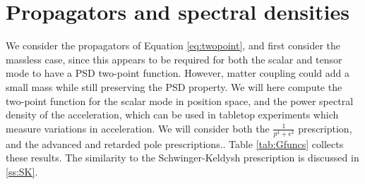 \documentclass[aps,preprintnumbers,superscriptaddress,longbibliography]{revtex4-1}
\begin{document}
\section{Propagators and spectral densities}

\label{sec:twopoint}

We consider the propagators of Equation \eqref{eq:twopoint}, and first consider the massless case, since this appears to be required for both the scalar and tensor mode to have a PSD two-point function. However, matter coupling could add a small mass while still preserving the PSD property. We will here compute the two-point function for the scalar mode in position space, and the power spectral density of the acceleration, which can be used in tabletop experiments which measure variations in acceleration. We will consider both the $\frac{1}{p^4+\epsilon^2}$ prescription, and the advanced and retarded pole prescriptions.. Table \ref{tab:Gfuncs} collects these results. The similarity to the Schwinger-Keldysh prescription is discussed in \eqref{ss:SK}.
\end{document}

